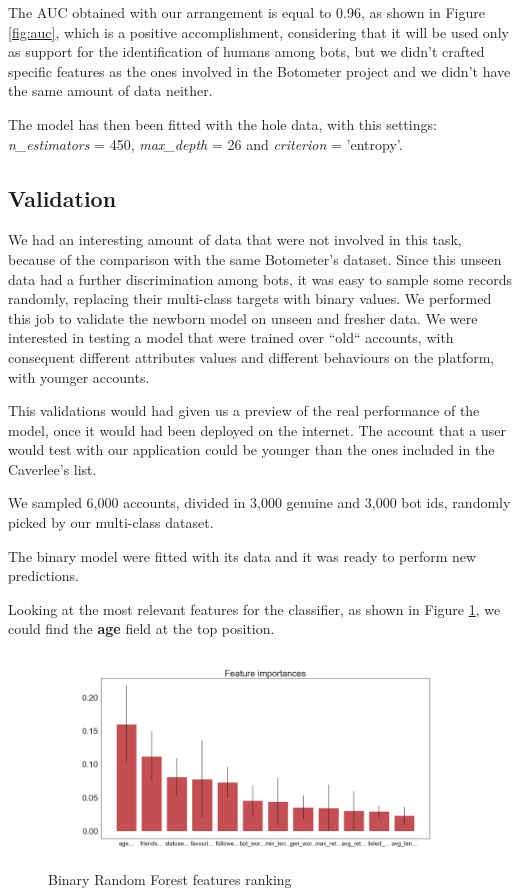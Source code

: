 The AUC obtained with our arrangement is equal to 0.96, as shown in Figure \ref{fig:auc}, which is a positive accomplishment, considering that it will be used only as support for the identification of humans among bots, but we didn't crafted specific features as the ones involved in the Botometer project and we didn't have the same amount of data neither.

The model has then been fitted with the hole data, with this settings: \textit{ n\_estimators} = 450, \textit{max\_depth} = 26 and \textit{criterion} = 'entropy'.

\subsection{Validation}

We had an interesting amount of data that were not involved in this task, because of the comparison with the same Botometer's dataset. Since this unseen data had a further discrimination among bots, it was easy to sample some records randomly, replacing their multi-class targets with binary values.
We performed this job to validate the newborn model on unseen and fresher data.
We were interested in testing a model that were trained over ``old`` accounts, with consequent different attributes values and different behaviours on the platform, with younger accounts.

This validations would had given us a preview of the real performance of the model, once it would had been deployed on the internet. The account that a user would test with our application could be younger than the ones included in the Caverlee's list.

We sampled 6,000 accounts, divided in 3,000 genuine and 3,000 bot ids, randomly picked by our multi-class dataset.

The binary model were fitted with its data and it was ready to perform new predictions.

Looking at the most relevant features for the classifier, as shown in Figure \ref{fig:bon_importances}, we could find the \textbf{age} field at the top position.

\begin{figure}[htp!]
	\centering
	\includegraphics[width=\columnwidth]{chapter5/figure/bon_importances.png}
	\caption{Binary Random Forest features ranking}
	\label{fig:bon_importances}
\end{figure}

